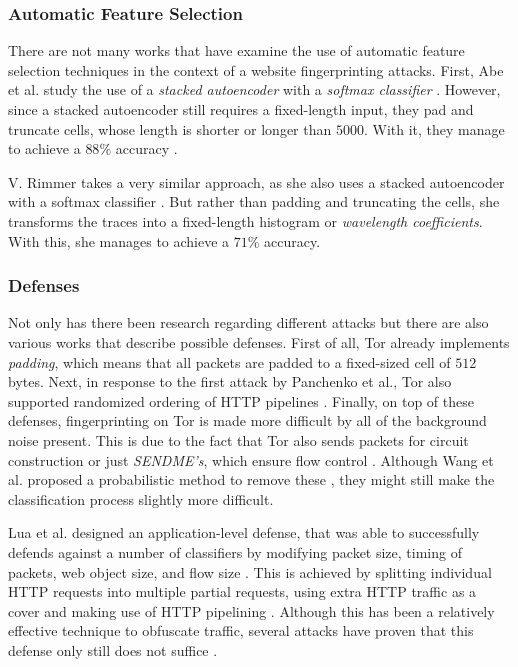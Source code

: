 \subsubsection{Automatic Feature Selection}

There are not many works that have examine the use of automatic feature selection techniques in the context of a website fingerprinting attacks.
First, Abe et al. study the use of a \textit{stacked autoencoder} with a \textit{softmax classifier} \cite{deeplearning}.
However, since a stacked autoencoder still requires a fixed-length input, they pad and truncate cells, whose length is shorter or longer than $5000$.
With it, they manage to achieve a $88\%$ accuracy \cite{deeplearning}.

V. Rimmer takes a very similar approach, as she also uses a stacked autoencoder with a softmax classifier \cite{deeplearningthesis}.
But rather than padding and truncating the cells, she transforms the traces into a fixed-length histogram or \textit{wavelength coefficients}.
With this, she manages to achieve a $71\%$ accuracy.

\subsubsection{Defenses}

Not only has there been research regarding different attacks but there are also various works that describe possible defenses.
First of all, Tor already implements \textit{padding}, which means that all packets are padded to a fixed-sized cell of $512$ bytes.
Next, in response to the first attack by Panchenko et al., Tor also supported randomized ordering of HTTP pipelines \cite{panchenko1, kfingerprinting, perry2011experimental}.
Finally, on top of these defenses, fingerprinting on Tor is made more difficult by all of the background noise present.
This is due to the fact that Tor also sends packets for circuit construction or just \textit{SENDME's}, which ensure flow control \cite{panchenko2}.
Although Wang et al. proposed a probabilistic method to remove these \cite{wang_goldberg_2013}, they might still make the classification process slightly more difficult.

Lua et al. designed an application-level defense, that was able to successfully defends against a number of classifiers by modifying packet size, timing of packets, web object size, and
flow size \cite{perry2011experimental}. This is achieved by splitting individual HTTP requests into multiple partial requests, using extra HTTP traffic as a cover and making use of HTTP pipelining \cite{cai_zhang_joshi_johnson_2012}.
Although this has been a relatively effective technique to obfuscate traffic, several attacks have proven that this defense only still does not suffice \cite{cai_zhang_joshi_johnson_2012,wang_cai_johnson_nithyanand_goldberg_2014}.

